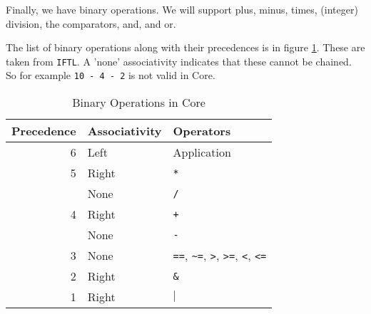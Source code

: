 \documentclass[11pt]{article}
\begin{document}
Finally, we have binary operations.  We will support plus, minus, times, (integer) division, the comparators, and, and or.

The list of binary operations along with their precedences is in figure \ref{fig-binop}.  These are taken from \texttt{IFTL}.
A 'none' associativity indicates that these cannot be chained.  So for example \texttt{10 - 4 - 2} is not valid in Core.  

\begin{table}[htbp]
\caption{\label{fig-binop}Binary Operations in Core}
\centering
\begin{tabular}{rll}
Precedence & Associativity & Operators\\
\hline
6 & Left & Application\\
5 & Right & \texttt{*}\\
 & None & \texttt{/}\\
4 & Right & \texttt{+}\\
 & None & \texttt{-}\\
3 & None & \texttt{==}, \texttt{\textasciitilde{}=}, \texttt{>}, \texttt{>=}, \texttt{<}, \texttt{<=}\\
2 & Right & \texttt{\&}\\
1 & Right & \(\vert{}\)\\
\end{tabular}
\end{table}
\end{document}
